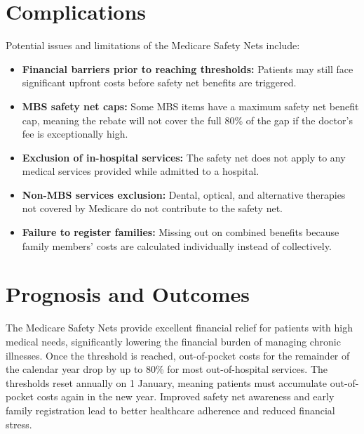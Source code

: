 \section*{Complications}
Potential issues and limitations of the Medicare Safety Nets include:
\begin{itemize}
    \item \textbf{Financial barriers prior to reaching thresholds:} Patients may still face significant upfront costs before safety net benefits are triggered.
    \item \textbf{MBS safety net caps:} Some MBS items have a maximum safety net benefit cap, meaning the rebate will not cover the full 80\% of the gap if the doctor's fee is exceptionally high.
    \item \textbf{Exclusion of in-hospital services:} The safety net does not apply to any medical services provided while admitted to a hospital.
    \item \textbf{Non-MBS services exclusion:} Dental, optical, and alternative therapies not covered by Medicare do not contribute to the safety net.
    \item \textbf{Failure to register families:} Missing out on combined benefits because family members' costs are calculated individually instead of collectively.
\end{itemize}

\section*{Prognosis and Outcomes}
The Medicare Safety Nets provide excellent financial relief for patients with high medical needs, significantly lowering the financial burden of managing chronic illnesses. Once the threshold is reached, out-of-pocket costs for the remainder of the calendar year drop by up to 80\% for most out-of-hospital services. The thresholds reset annually on 1 January, meaning patients must accumulate out-of-pocket costs again in the new year. Improved safety net awareness and early family registration lead to better healthcare adherence and reduced financial stress.

